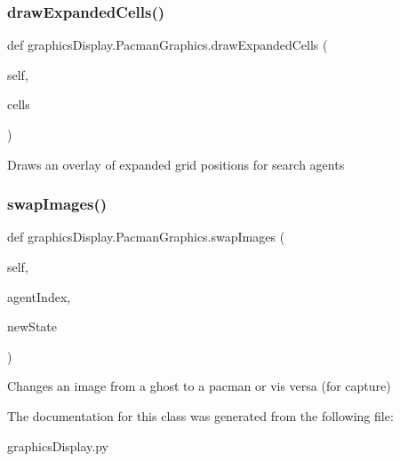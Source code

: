 \subsubsection{\texorpdfstring{draw\+Expanded\+Cells()}{drawExpandedCells()}}
{\footnotesize\ttfamily def graphics\+Display.\+Pacman\+Graphics.\+draw\+Expanded\+Cells (\begin{DoxyParamCaption}\item[{}]{self,  }\item[{}]{cells }\end{DoxyParamCaption})}

\begin{DoxyVerb}Draws an overlay of expanded grid positions for search agents
\end{DoxyVerb}
 \mbox{\label{classgraphics_display_1_1_pacman_graphics_afa38cdde4141fb7f84b80983404f6ab0}} 
\subsubsection{\texorpdfstring{swap\+Images()}{swapImages()}}
{\footnotesize\ttfamily def graphics\+Display.\+Pacman\+Graphics.\+swap\+Images (\begin{DoxyParamCaption}\item[{}]{self,  }\item[{}]{agent\+Index,  }\item[{}]{new\+State }\end{DoxyParamCaption})}

\begin{DoxyVerb}  Changes an image from a ghost to a pacman or vis versa (for capture)
\end{DoxyVerb}
 

The documentation for this class was generated from the following file\+:\begin{DoxyCompactItemize}
\item 
graphics\+Display.\+py\end{DoxyCompactItemize}
